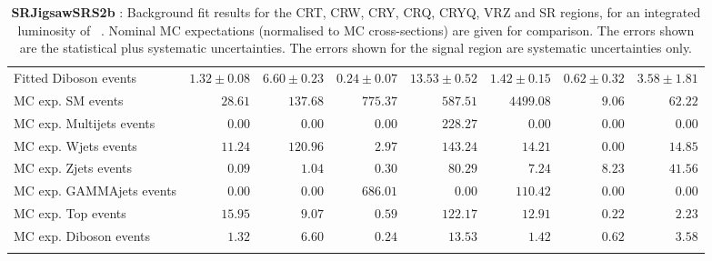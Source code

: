 \begin{table}
\begin{center}
{\begin{tabular*}{\textwidth}{@{\extracolsep{\fill}}lrrrrrrr}
        Fitted Diboson events         & $1.32 \pm 0.08$          & $6.60 \pm 0.23$          & $0.24 \pm 0.07$          & $13.53 \pm 0.52$          & $1.42 \pm 0.15$          & $0.62 \pm 0.32$          & $3.58 \pm 1.81$              \\
 \noalign{\smallskip}\hline\noalign{\smallskip}
MC exp. SM events              & $28.61$          & $137.68$          & $775.37$          & $587.51$          & $4499.08$          & $9.06$          & $62.22$              \\
\noalign{\smallskip}\hline\noalign{\smallskip}
        MC exp. Multijets events         & $0.00$          & $0.00$          & $0.00$          & $228.27$          & $0.00$          & $0.00$          & $0.00$              \\
        MC exp. Wjets events         & $11.24$          & $120.96$          & $2.97$          & $143.24$          & $14.21$          & $0.00$          & $14.85$              \\
        MC exp. Zjets events         & $0.09$          & $1.04$          & $0.30$          & $80.29$          & $7.24$          & $8.23$          & $41.56$              \\
        MC exp. GAMMAjets events         & $0.00$          & $0.00$          & $686.01$          & $0.00$          & $110.42$          & $0.00$          & $0.00$              \\
        MC exp. Top events         & $15.95$          & $9.07$          & $0.59$          & $122.17$          & $12.91$          & $0.22$          & $2.23$              \\
        MC exp. Diboson events         & $1.32$          & $6.60$          & $0.24$          & $13.53$          & $1.42$          & $0.62$          & $3.58$              \\
\noalign{\smallskip}\hline\noalign{\smallskip}
\end{tabular*}
}
\end{center}
\caption{{\bf SRJigsawSRS2b} : Background fit results for the CRT, CRW, CRY, CRQ, CRYQ, VRZ and SR regions, for an integrated luminosity of \ourintlumi~\ifb. Nominal MC expectations (normalised to MC cross-sections) are given for comparison. The errors shown are the statistical plus systematic uncertainties. The errors shown for the signal region are systematic uncertainties only.}
\label{table.results.systematics.in.logL.fit.CRT.CRW.CRY.CRQ.CRYQ.VRZ.SR.SRJigsawSRS2b}
\end{table}
%